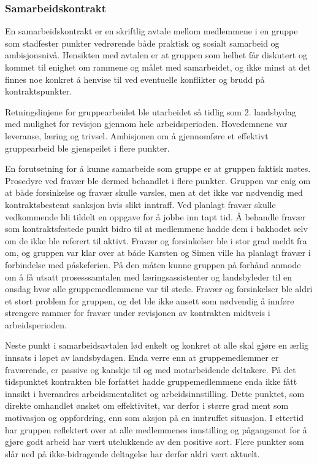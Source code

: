 \subsubsection{Samarbeidskontrakt}
En samarbeidskontrakt er en skriftlig avtale mellom medlemmene i en gruppe som stadfester punkter vedrørende både praktisk og sosialt samarbeid og ambisjonsnivå. 
Hensikten med avtalen er at gruppen som helhet får diskutert og kommet til enighet om rammene og målet med samarbeidet, og ikke minst at det finnes noe konkret å henvise til ved eventuelle konflikter og brudd på kontraktspunkter. 

Retningslinjene for gruppearbeidet ble utarbeidet så tidlig som 2. landsbydag med mulighet for revisjon gjennom hele arbeidsperioden. 
Hovedemnene var leveranse, læring og trivsel.
Ambisjonen om å gjennomføre et effektivt gruppearbeid ble gjenspeilet i flere punkter. 

En forutsetning for å kunne samarbeide som gruppe er at gruppen faktisk møtes. 
Prosedyre ved fravær ble dermed behandlet i flere punkter. 
Gruppen var enig om at både forsinkelse og fravær skulle varsles, men at det ikke var nødvendig med kontraktsbestemt sanksjon hvis slikt inntraff. 
Ved planlagt fravær skulle vedkommende bli tildelt en oppgave for å jobbe inn tapt tid. 
Å behandle fravær som kontraktsfestede punkt bidro til at medlemmene hadde dem i bakhodet selv om de ikke ble referert til aktivt.
Fravær og forsinkelser ble i stor grad meldt fra om, og gruppen var klar over at både Karsten og Simen ville ha planlagt fravær i forbindelse med påskeferien. 
På den måten kunne gruppen på forhånd anmode om å få utsatt prosesssamtalen med læringsassistenter og landsbyleder til en onsdag hvor alle gruppemedlemmene var til stede.
Fravær og forsinkelser ble aldri et stort problem for gruppen, og det ble ikke ansett som nødvendig å innføre strengere rammer for fravær under revisjonen av kontrakten midtveis i arbeidsperioden. 

Neste punkt i samarbeidsavtalen lød enkelt og konkret at alle skal gjøre en ærlig innsats i løpet av landsbydagen.
Enda verre enn at gruppemedlemmer er fraværende, er passive og kanskje til og med motarbeidende deltakere.
På det tidspunktet kontrakten ble forfattet hadde gruppemedlemmene enda ikke fått innsikt i hverandres arbeidsmentalitet og arbeidsinnstilling.
Dette punktet, som direkte omhandlet ønsket om effektivitet, var derfor i større grad ment som motivasjon og oppfordring, enn som aksjon på en inntruffet situasjon.
I ettertid har gruppen reflektert over at alle medlemmenes innstilling og pågangsmot for å gjøre godt arbeid har vært utelukkende av den positive sort.
Flere punkter som slår ned på ikke-bidragende deltagelse har derfor aldri vært aktuelt.

